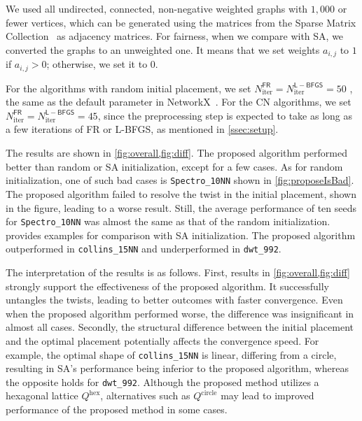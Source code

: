 \documentclass[11pt]{article}
\begin{document}
We used all undirected, connected, non-negative weighted graphs with $1{,}000$
or fewer vertices, which can be generated using the matrices from the Sparse
Matrix Collection~\citep{davis2011university} as adjacency matrices. For
fairness, when we compare with \textsf{SA}, we converted the graphs to an unweighted
one. It means that we set weights $a_{i,j}$ to $1$ if $a_{i,j}> 0$; otherwise,
we set it to $0$.

For the algorithms with random initial placement, we set $N_{\mathrm{iter}}^{\mathsf{FR}}
  = N_{\mathrm{iter}}^{\mathsf{L-BFGS}}= 50$ , the same as the default parameter
in NetworkX~\citep{hagberg2008exploring}. For the \textsf{CN} algorithms, we set
$N_{\mathrm{iter}}^{\mathsf{FR}}= N_{\mathrm{iter}}^{\mathsf{L-BFGS}}= 45$,
since the preprocessing step is expected to take as long as a few iterations
of FR or L-BFGS, as mentioned in \cref{ssec:setup}.

The results are shown in \cref{fig:overall,fig:diff}. The proposed algorithm
performed better than random or SA initialization, except for a few cases. As
for random initialization, one of such bad cases is \texttt{Spectro\_10NN}
shown in \cref{fig:proposeIsBad}. The proposed algorithm failed to resolve the
twist in the initial placement, shown in the figure, leading to a worse result.
Still, the average performance of ten seeds for \texttt{Spectro\_10NN} was almost the same as that of the random initialization.  provides examples for comparison with SA initialization. The proposed algorithm outperformed in \texttt{collins\_15NN} and underperformed in \texttt{dwt\_992}.

The interpretation of the results is as follows. First, results in
\cref{fig:overall,fig:diff} strongly support the effectiveness of the proposed
algorithm. It successfully untangles the twists, leading to better outcomes
with faster convergence. Even when the proposed algorithm performed worse, the
difference was insignificant in almost all cases. Secondly, the structural
difference between the initial placement and the optimal placement potentially
affects the convergence speed. For example, the optimal shape of \texttt{collins\_15NN}
is linear, differing from a circle, resulting in \textsf{SA}'s performance
being inferior to the proposed algorithm, whereas the opposite holds for \texttt{dwt\_992}.
Although the proposed method utilizes a hexagonal lattice $Q^{\mathrm{hex}}$,
alternatives such as $Q^{\mathrm{circle}}$ may lead to improved performance of
the proposed method in some cases.
\end{document}
